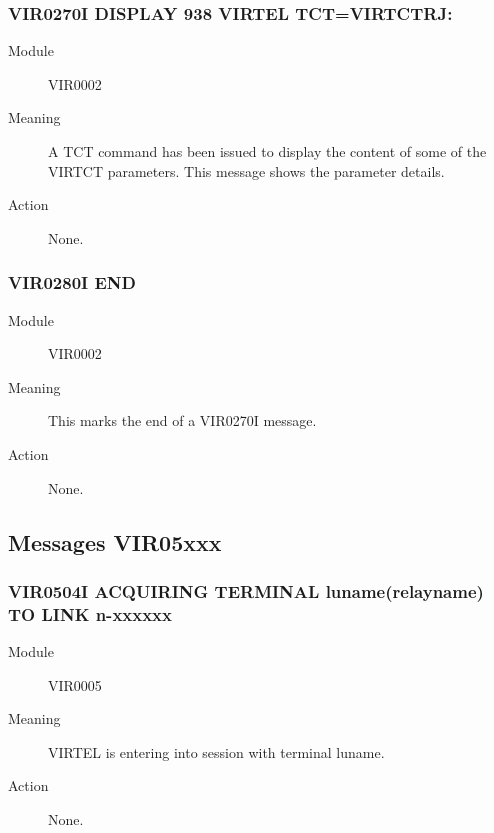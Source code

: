 \documentclass[letterpaper,10pt,english]{sphinxmanual}
\begin{document}
\subsubsection{VIR0270I DISPLAY 938 VIRTEL TCT=VIRTCTRJ:}
\label{\detokenize{messages:vir0270i-display-938-virtel-tct-virtctrj}}\begin{description}
\item[{Module}] \leavevmode
VIR0002

\item[{Meaning}] \leavevmode
A TCT command has been issued to display the content of some of the VIRTCT parameters. This message shows the parameter details.

\item[{Action}] \leavevmode
None.

\end{description}


\subsubsection{VIR0280I END}
\label{\detokenize{messages:vir0280i-end}}\begin{description}
\item[{Module}] \leavevmode
VIR0002

\item[{Meaning}] \leavevmode
This marks the end of a VIR0270I message.

\item[{Action}] \leavevmode
None.

\end{description}


\subsection{Messages VIR05xxx}
\label{\detokenize{messages:messages-vir05xxx}}

\subsubsection{VIR0504I ACQUIRING TERMINAL luname(relayname) TO LINK n-xxxxxx}
\label{\detokenize{messages:vir0504i-acquiring-terminal-luname-relayname-to-link-n-xxxxxx}}\begin{description}
\item[{Module}] \leavevmode
VIR0005

\item[{Meaning}] \leavevmode
VIRTEL is entering into session with terminal luname.

\item[{Action}] \leavevmode
None.

\end{description}
\end{document}
